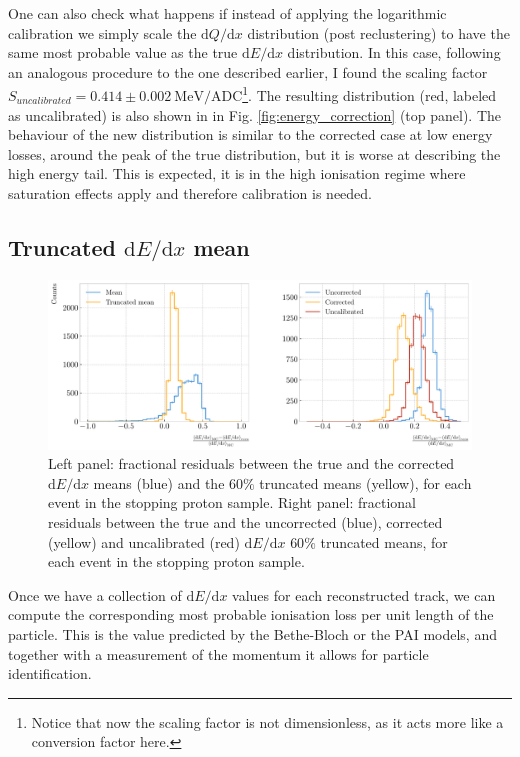 One can also check what happens if instead of applying the logarithmic calibration we simply scale the $\mathrm{d}Q/\mathrm{d}x$ distribution (post reclustering) to have the same most probable value as the true  $\mathrm{d}E/\mathrm{d}x$ distribution. In this case, following an analogous procedure to the one described earlier, I found the scaling factor $S_{uncalibrated}=0.414\pm0.002~\mathrm{MeV}/\mathrm{ADC}$\footnote{Notice that now the scaling factor is not dimensionless, as it acts more like a conversion factor here.}. The resulting distribution (red, labeled as uncalibrated) is also shown in in Fig. \ref{fig:energy_correction} (top panel). The behaviour of the new distribution is similar to the corrected case at low energy losses, around the peak of the true distribution, but it is worse at describing the high energy tail. This is expected, it is in the high ionisation regime where saturation effects apply and therefore calibration is needed.

\subsection[Truncated \texorpdfstring{$\mathrm{d}E/\mathrm{d}x$}{dE/dx} mean]{Truncated \boldmath\texorpdfstring{$\mathrm{d}E/\mathrm{d}x$}{dE/dx} mean}

\begin{figure}[t]
	\centering
	\includegraphics[width=.90\linewidth]{Images/GArSoft_PID/dEdx/reco_dEdx_truncation_comp.pdf}
	\caption{Left panel: fractional residuals between the true and the corrected $\mathrm{d}E/\mathrm{d}x$ means (blue) and the $60\%$ truncated means (yellow), for each event in the stopping proton sample. Right panel: fractional residuals between the true and the uncorrected (blue), corrected (yellow) and uncalibrated (red) $\mathrm{d}E/\mathrm{d}x$ $60\%$ truncated means, for each event in the stopping proton sample.}
	\label{fig:energy_trucation_comp}
\end{figure}

Once we have a collection of $\mathrm{d}E/\mathrm{d}x$ values for each reconstructed track, we can compute the corresponding most probable ionisation loss per unit length of the particle. This is the value predicted by the Bethe-Bloch or the PAI models, and together with a measurement of the momentum it allows for particle identification.

